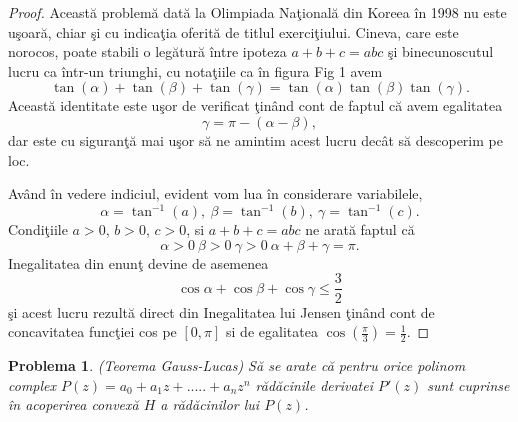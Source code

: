 \documentclass[a4paper,12pt,oneside]{report}
\newtheorem{problem}{Problema}
\begin{document}
\begin{proof}
Aceast\u{a} problem\u{a} dat\u{a} la Olimpiada Na\c{t}ional\u{a} din Koreea \^{i}n 1998 nu este u\c{s}oar\u{a}, chiar \c{s}i cu indica\c{t}ia oferit\u{a} de titlul exerci\c{t}iului. Cineva, care este norocos, poate stabili o leg\u{a}tur\u{a} \^{i}ntre  ipoteza \(a + b + c = abc\) \c{s}i binecunoscutul lucru ca \^{i}ntr-un triunghi, cu nota\c{t}iile  ca \^{i}n figura Fig 1
 avem
 \begin{displaymath}
   \tan\left ( \alpha  \right ) + \tan\left ( \beta   \right ) + \tan\left ( \gamma   \right ) = \tan\left ( \alpha  \right )\tan\left ( \beta   \right )\tan\left ( \gamma   \right ).
 \end{displaymath}
Aceast\u{a} identitate este u\c{s}or de verificat \c{t}in\^{a}nd cont de faptul c\u{a} avem egalitatea \[\gamma  = \pi  - \left ( \alpha  - \beta  \right ),\] dar este cu siguran\c{t}\u{a} mai u\c{s}or s\u{a} ne amintim acest lucru dec\^{a}t s\u{a} descoperim pe loc.

Av\^{a}nd \^{i}n vedere indiciul, evident vom lua \^{i}n considerare variabilele,  \[\alpha  = \tan^{-1}\left ( a \right ),~ \beta = \tan ^{-1}\left ( b \right ),~\gamma  = \tan ^{-1}\left ( c \right ).\]
Condi\c{t}iile \(a> 0\), \(b> 0\), \(c> 0\), si \(a+b+c = abc\) ne arat\u{a} faptul c\u{a} \[\alpha > 0 ~\beta > 0~\gamma > 0~\alpha + \beta + \gamma  = \pi.\] Inegalitatea din enun\c{t} devine de asemenea \[\cos \alpha  + \cos \beta  + \cos \gamma  \leq \frac{3}{2}\] \c{s}i acest lucru rezult\u{a} direct din Inegalitatea lui Jensen  \c{t}in\^{a}nd cont de  concavitatea func\c{t}iei cos
 pe \(\left [ 0 , \pi  \right ]\)  si de egalitatea \(\cos \left ( \frac{\pi }{3} \right ) = \frac{1}{2}\).
\end{proof}
\begin{problem} (Teorema Gauss-Lucas)
S\u{a} se arate c\u{a} pentru orice polinom complex \(P\left ( z \right ) = a_{0} + a_{1}z + ..... +a_{n}z^{n}\) r\u{a}d\u{a}cinile derivatei \({P}'\left ( z \right )\) sunt cuprinse \^{i}n acoperirea convex\u{a} \(H\) a r\u{a}d\u{a}cinilor lui \(P\left ( z \right )\).
\end{problem}
\end{document}
